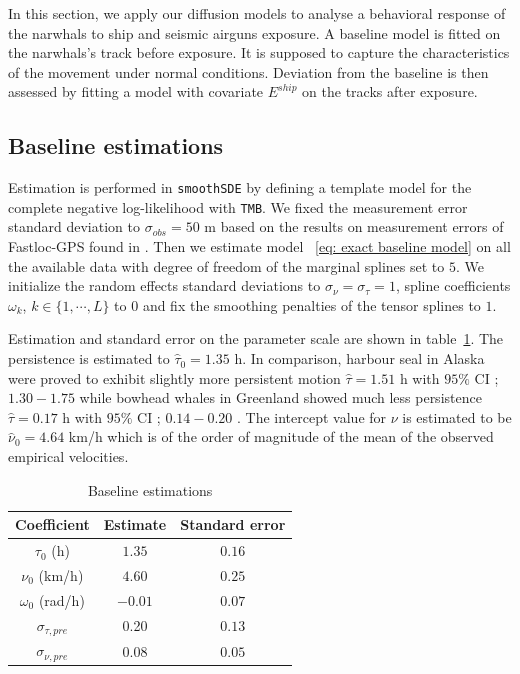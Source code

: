 \documentclass[11pt]{article}
\newcommand {\1}{\mathbb{1}}
\theoremstyle{definition}
\theoremstyle{remark}
\theoremstyle{remark}
\begin{document}
In this section, we apply our diffusion models to analyse a behavioral response of the narwhals to ship and seismic airguns exposure.
A baseline model is fitted on the narwhals's track before exposure. It is supposed to capture the characteristics of the movement under normal conditions. Deviation from the baseline is then assessed by fitting a model with covariate $E^{ship}$ on the tracks after exposure.


\subsection{Baseline estimations}

Estimation is performed in \texttt{smoothSDE} by defining a template model for the complete negative  log-likelihood with \texttt{TMB}.  We fixed the measurement error standard deviation to $\sigma_{obs}=50$ m based on the results on measurement errors of Fastloc-GPS found in \cite{wensveen_path_2015}. Then we estimate model ~\eqref{eq: exact baseline model} on all the available data with degree of freedom of the marginal splines set to $5$. We initialize the random effects standard deviations to $\sigma_{\nu}=\sigma_{\tau}=1$, spline coefficients $\omega_k$, $k \in \{1,\cdots,L\}$ to 0 and fix the smoothing penalties of the tensor splines to $1$.

Estimation and standard error on the parameter scale are shown in table~\ref{table: baseline estimations}. 
The persistence is estimated to $\hat{\tau}_{0}=1.35 $ h.
In comparison, harbour seal in Alaska were proved to exhibit slightly more persistent motion $\hat{\tau}=1.51$ h with $95\%$ CI ; $1.30 -1.75$  \cite{johnson_continuoustime_2008} while bowhead whales in Greenland showed much less persistence $\hat{\tau}=0.17$ h with $95\%$ CI ; $0.14 -0.20$  \cite{gurarie_correlated_2017}.
The intercept value for $\nu$ is estimated to be $\hat{\nu}_{0}=4.64$ km/h which is of the order of magnitude of the mean of the observed empirical velocities.
\begin{table}[H]
	\centering
	\begin{tabular}{|c|c|c|}
		\hline
		Coefficient   & Estimate  & Standard error \\
		\hline
		$\tau_0$ (h)   & $1.35$    &  $0.16$ \\
		$\nu_0$ (km/h)  & $4.60$   &  $0.25$\\
		$\omega_0$ (rad/h)    & $-0.01$    &  $0.07$ \\
		$\sigma_{\tau,pre}$    & 0.20   &  $0.13$ \\
		$\sigma_{\nu,pre}$    & 0.08   &  $0.05$ \\
		\hline
	\end{tabular}
	\caption{Baseline estimations}
	\label{table: baseline estimations}
\end{table}
\end{document}
